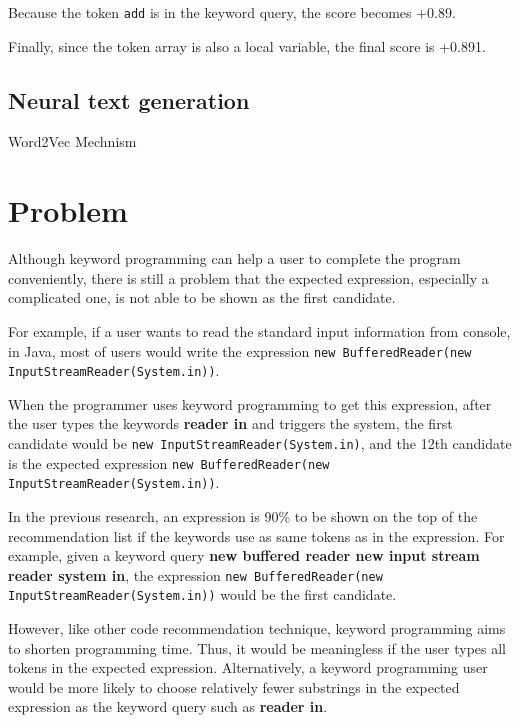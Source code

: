 \documentclass[PRO,english]{ipsj}
\begin{document}
Because the token \texttt{add} is in the keyword query, the score becomes +0.89.

Finally, since the token array is also a local variable, the final score is +0.891.

\subsection{Neural text generation}
Word2Vec
Mechnism

\section{Problem}
Although keyword programming can help a user to complete the program conveniently, there is still a problem that the expected expression, especially a complicated one, is not able to be shown as the first candidate.

For example, if a user wants to read the standard input information from console, in Java, most of users would write the expression \texttt{new BufferedReader(new InputStreamReader(System.in))}. 

When the programmer uses keyword programming to get this expression, after the user types the keywords \textbf{reader in} and triggers the system, the first candidate would be \texttt{new InputStreamReader(System.in)}, and the 12th candidate is the expected expression \texttt{new BufferedReader(new InputStreamReader(System.in))}. 



In the previous research, an expression is 90\% to be shown on the top of the recommendation list if the keywords use as same tokens as in the expression. For example, given a keyword query \textbf{new buffered reader new input stream reader system in}, the expression \texttt{new BufferedReader(new InputStreamReader(System.in))} would be the first candidate.

However, like other code recommendation technique, keyword programming aims to shorten programming time. Thus, it would be meaningless if the user types all tokens in the expected expression. Alternatively, a keyword programming user would be more likely to choose relatively fewer substrings in the expected expression as the keyword query such as \textbf{reader in}. 
\end{document}
